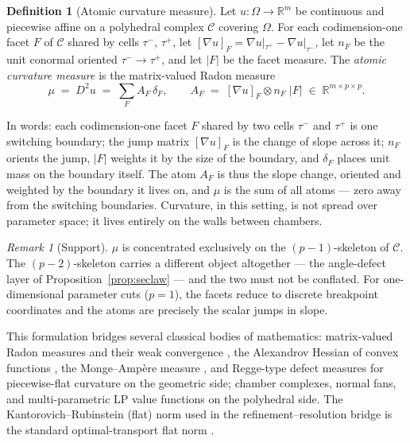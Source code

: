 \documentclass[11pt,a4paper]{article}
\theoremstyle{plain}
\theoremstyle{definition}
\newtheorem{definition}[theorem]{Definition}
\theoremstyle{remark}
\newtheorem{remark}[theorem]{Remark}
\newcommand{\CC}{\mathcal{C}}
\newcommand{\RR}{\mathbb{R}}
\begin{document}
\begin{definition}[Atomic curvature measure]\label{def:mu}
Let $u : \Omega \to \RR^m$ be continuous and piecewise affine on a
polyhedral complex $\CC$ covering $\Omega$. For each codimension-one facet
$F$ of $\CC$ shared by cells $\tau^-$, $\tau^+$, let
$[\nabla u]_F = \nabla u|_{\tau^+} - \nabla u|_{\tau^-}$, let $n_F$ be the
unit conormal oriented $\tau^- \to \tau^+$, and let $|F|$ be the facet
measure. The \emph{atomic curvature measure} is the matrix-valued Radon
measure
\[
\mu \;=\; D^2 u \;=\; \sum_{F} A_F \, \delta_F,
\qquad
A_F \;=\; [\nabla u]_F \otimes n_F \; |F| \;\in\; \RR^{m \times p \times p}.
\]
\end{definition}

In words: each codimension-one facet $F$ shared by two cells
$\tau^-$ and $\tau^+$ is one switching boundary; the jump matrix
$[\nabla u]_F$ is the change of slope across it; $n_F$ orients the
jump, $|F|$ weights it by the size of the boundary, and $\delta_F$
places unit mass on the boundary itself. The atom $A_F$ is thus the
slope change, oriented and weighted by the boundary it lives on, and
$\mu$ is the sum of all atoms --- zero away from the switching
boundaries. Curvature, in this setting, is not spread over parameter
space; it lives entirely on the walls between chambers.

\begin{remark}[Support]\label{rem:support}
$\mu$ is concentrated exclusively on the $(p-1)$-skeleton of $\CC$.
The $(p-2)$-skeleton carries a different object altogether --- the
angle-defect layer of Proposition~\ref{prop:seclaw} --- and the two
must not be conflated. For one-dimensional parameter cuts ($p=1$),
the facets reduce to discrete breakpoint coordinates and the atoms
are precisely the scalar jumps in slope.
\end{remark}

This formulation bridges several classical bodies of mathematics:
matrix-valued Radon measures and their weak convergence
\citep{billingsley1999}, the Alexandrov Hessian of convex functions
\citep{alexandrov1939}, the Monge--Amp\`ere measure \citep{gutierrez2001},
and Regge-type defect measures for piecewise-flat curvature
\citep{regge1961, cheeger1984} on the geometric side; chamber
complexes, normal fans, and multi-parametric LP value functions
\citep{rockafellar1970, ziegler1995, borrelli2003} on the polyhedral
side. The Kantorovich--Rubinstein (flat) norm used in the
refinement--resolution bridge is the standard optimal-transport flat
norm \citep{villani2009}.
\end{document}
